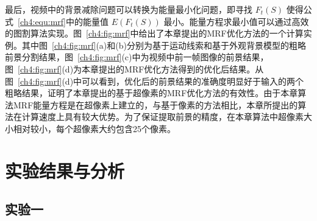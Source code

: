 最后，视频中的背景减除问题可以转换为能量最小化问题，即寻找 $F_{t}(S)$ 使得公式~\ref{ch4:equ:mrf}中的能量值 $E(F_{t}(S))$ 最小。能量方程求最小值可以通过高效的图割算法\cite{graphcut04}实现。图~\ref{ch4:fig:mrf}中给出了本章提出的MRF优化方法的一个计算实例。其中图~\ref{ch4:fig:mrf}(a)和(b)分别为基于运动线索和基于外观背景模型的粗略前景分割结果，图~\ref{ch4:fig:mrf}(c)中为视频中前一帧图像的前景结果，图~\ref{ch4:fig:mrf}(d)为本章提出的MRF优化方法得到的优化后结果。从图~\ref{ch4:fig:mrf}(d)中可以看到，优化后的前景结果的准确度明显好于输入的两个粗略结果，证明了本章提出的基于超像素的MRF优化方法的有效性。由于本章算法MRF能量方程是在超像素上建立的，与基于像素的方法\cite{Multitransform,SubspaceTracking}相比，本章所提出的算法在计算速度上具有较大优势。为了保证提取前景的精度，在本章算法中超像素大小相对较小，每个超像素大约包含25个像素。 \par


 \section{实验结果与分析}
 \label{ch4:sec:results}
 \subsection{实验一}
 \label{ch4:sec:sub:test1}

